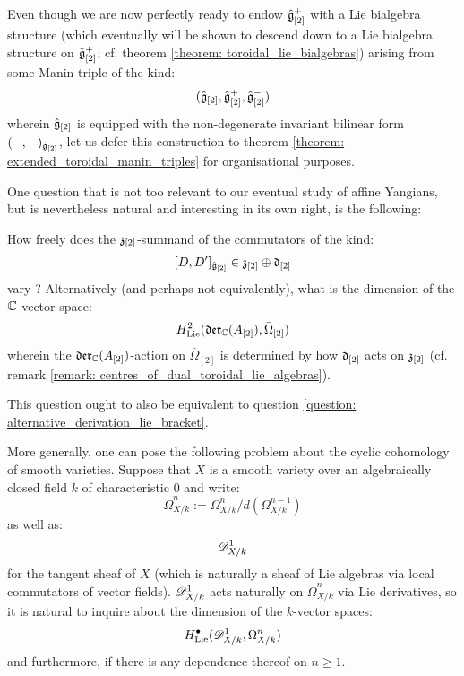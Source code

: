         Even though we are now perfectly ready to endow $\hat{\mathfrak{g}}_{[2]}^+$ with a Lie bialgebra structure (which eventually will be shown to descend down to a Lie bialgebra structure on $\tilde{\mathfrak{g}}_{[2]}^+$; cf. theorem \ref{theorem: toroidal_lie_bialgebras}) arising from some Manin triple of the kind:
            $$(\hat{\mathfrak{g}}_{[2]}, \hat{\mathfrak{g}}_{[2]}^+, \hat{\mathfrak{g}}_{[2]}^-)$$
        wherein $\hat{\mathfrak{g}}_{[2]}$ is equipped with the non-degenerate invariant bilinear form $(-, -)_{\hat{\mathfrak{g}}_{[2]}}$, let us defer this construction to theorem \ref{theorem: extended_toroidal_manin_triples} for organisational purposes.

        One question that is not too relevant to our eventual study of affine Yangians, but is nevertheless natural and interesting in its own right, is the following:
        \begin{question} \label{question: uniqueness_of_extended_toroidal_lie_algebras}
            How freely does the $\mathfrak{z}_{[2]}$-summand of the commutators of the kind:
                $$[D, D']_{ \hat{\mathfrak{g}}_{[2]} } \in \mathfrak{z}_{[2]} \oplus \mathfrak{d}_{[2]}$$
            vary ? Alternatively (and perhaps not equivalently), what is the dimension of the $\mathbb{C}$-vector space:
                $$H^2_{\mathrm{Lie}}( \mathfrak{der}_{\mathbb{C}}(A_{[2]}), \bar{\Omega}_{[2]} )$$
            wherein the $\mathfrak{der}_{\mathbb{C}}(A_{[2]})$-action on $\bar{\Omega}_{[2]}$ is determined by how $\mathfrak{d}_{[2]}$ acts on $\mathfrak{z}_{[2]}$ (cf. remark \ref{remark: centres_of_dual_toroidal_lie_algebras}).
    
            This question ought to also be equivalent to question \ref{question: alternative_derivation_lie_bracket}. 
        \end{question}
        \begin{question}
            More generally, one can pose the following problem about the cyclic cohomology of smooth varieties. Suppose that $X$ is a smooth variety over an algebraically closed field $k$ of characteristic $0$ and write:
                $$\bar{\Omega}_{X/k}^n := \Omega_{X/k}^n/d( \Omega_{X/k}^{n - 1} )$$
            as well as:
                $$\mathscr{D}_{X/k}^1$$
            for the tangent sheaf of $X$ (which is naturally a sheaf of Lie algebras via local commutators of vector fields). $\mathscr{D}_{X/k}^1$ acts naturally on $\bar{\Omega}_{X/k}^n$ via Lie derivatives, so it is natural to inquire about the dimension of the $k$-vector spaces:
                $$H^{\bullet}_{\mathrm{Lie}}( \mathscr{D}_{X/k}^1, \bar{\Omega}_{X/k}^n )$$
            and furthermore, if there is any dependence thereof on $n \geq 1$.  
        \end{question}
